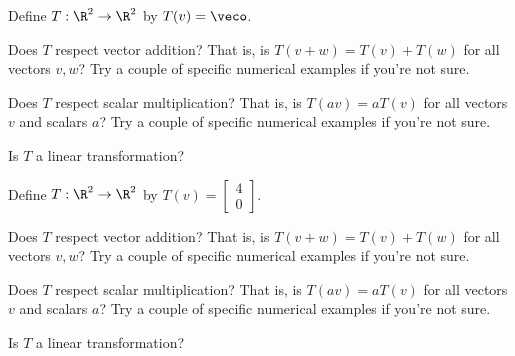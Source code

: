 \endedxproblem



Define $T: \R^2 \rightarrow \R^2$ by $T(v) = \veco$.  

Does $T$ respect vector addition?  That is, is $T(v + w) = T(v) + T(w)$ for all 
vectors $v, w$?
Try a couple of specific numerical examples if you're not sure.  


Does $T$ respect scalar multiplication?  
That is, is $T(av) = aT(v)$ for all vectors $v$ and scalars $a$?
Try a couple of specific numerical examples if you're not sure.  



Is $T$ a linear transformation?



\endedxproblem


Define $T: \R^2 \rightarrow \R^2$ by $T(v) = \left[\begin{array}{c}
4 \\
0 
\end{array} \right]$.  

Does $T$ respect vector addition?  That is, is $T(v + w) = T(v) + T(w)$ for all 
vectors $v,w$?
Try a couple of specific numerical examples if you're not sure.  


Does $T$ respect scalar multiplication?  
That is, is $T(av) = aT(v)$ for all vectors $v$ and scalars $a$?
Try a couple of specific numerical examples if you're not sure.  



Is $T$ a linear transformation?



